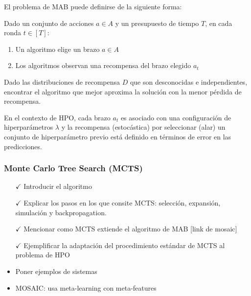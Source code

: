 El problema de MAB puede definirse de la siguiente forma:

Dado un conjunto de acciones $a \in A$ y un presupuesto de tiempo $T$, en cada ronda $t \in [T]$:

\begin{enumerate}
	\item Un algoritmo elige un brazo $a \in A$
	\item Los algoritmos observan una recompensa del brazo elegido $a_t$
\end{enumerate}

Dado las distribuciones de recompensa $D$ que son desconocidas e independientes, encontrar el algoritmo que mejor aproxima la solución con la menor pérdida de recompensa.

En el contexto de HPO, cada brazo $a_t$ es asociado con una configuración de hiperparámetros $\lambda$ y la recompensa (estocástica) por seleccionar (alar) un conjunto de hiperparámetro previo está definido en términos de error en las predicciones.


\subsubsection{Monte Carlo Tree Search (MCTS)}


\begin{itemize}
	\item[$\checkmark$] Introducir el algoritmo
	\item[$\checkmark$] Explicar los pasos en los que consite MCTS: selección, expansión, simulación y backpropagation.
	\item[$\checkmark$] Mencionar como MCTS extiende el algoritmo de MAB [link de mosaic]
	\item[$\checkmark$] Ejemplificar la adaptación del procedimiento estándar de MCTS al problema de HPO 
	\item Poner ejemplos de sistemas
	\item MOSAIC: usa meta-learning con meta-features
\end{itemize}

